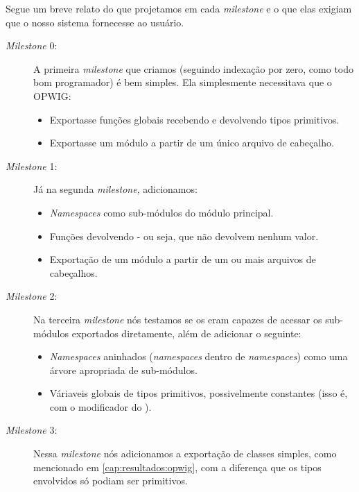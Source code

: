 Segue um breve relato do que projetamos em cada \textit{milestone} e o que elas
exigiam que o nosso sistema fornecesse ao usuário.

\begin{description}
  \item[\textit{Milestone} 0:] A primeira \textit{milestone} que criamos (seguindo indexação
    por zero, como todo bom programador) é bem simples. Ela simplesmente necessitava que o
    OPWIG:
    \begin{itemize}
      \item Exportasse funções globais recebendo e devolvendo tipos primitivos.
      \item Exportasse um módulo a partir de um único arquivo de cabeçalho.
    \end{itemize}
    
  \item[\textit{Milestone} 1:] Já na segunda \textit{milestone}, adicionamos:
    \begin{itemize}
      \item \textit{Namespaces} como sub-módulos do módulo principal.
      \item Funções devolvendo  - ou seja, que não devolvem nenhum valor.
      \item Exportação de um módulo a partir de um ou mais arquivos de cabeçalhos.
    \end{itemize}
    
  \item[\textit{Milestone} 2:] Na terceira \textit{milestone} nós testamos se os
     eram capazes de acessar os sub-módulos exportados diretamente, além
    de adicionar o seguinte:
    \begin{itemize}
      \item \textit{Namespaces} aninhados (\textit{namespaces} dentro de \textit{namespaces})
        como uma árvore apropriada de sub-módulos.
      \item Váriaveis globais de tipos primitivos, possivelmente constantes
        (isso é, com o modificador  do \C{}).
    \end{itemize}
    
  \item[\textit{Milestone} 3:] Nessa \textit{milestone} nós adicionamos a exportação de classes
    simples, como mencionado em \ref{cap:resultados:opwig}, com a diferença que os tipos envolvidos
    só podiam ser primitivos.
    

\end{description}
